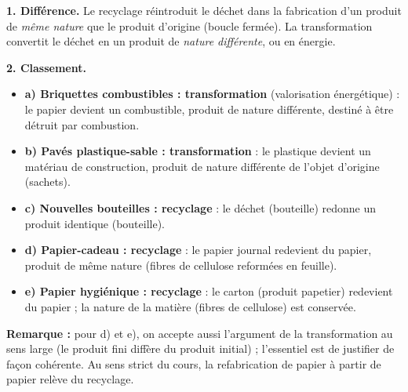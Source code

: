 \documentclass[11pt]{article}
\newcommand{\cle}[1]{{\popxbold\color{popdark}#1}}
\begin{document}
\begin{corrige}
\textbf{1. Différence.} Le \cle{recyclage} réintroduit le déchet dans la fabrication d'un produit de \emph{même nature} que le produit d'origine (boucle fermée). La \cle{transformation} convertit le déchet en un produit de \emph{nature différente}, ou en énergie.

\textbf{2. Classement.}
\begin{itemize}
\item \textbf{a) Briquettes combustibles : transformation} (valorisation énergétique) : le papier devient un combustible, produit de nature différente, destiné à être détruit par combustion.
\item \textbf{b) Pavés plastique-sable : transformation} : le plastique devient un matériau de construction, produit de nature différente de l'objet d'origine (sachets).
\item \textbf{c) Nouvelles bouteilles : recyclage} : le déchet (bouteille) redonne un produit identique (bouteille).
\item \textbf{d) Papier-cadeau : recyclage} : le papier journal redevient du papier, produit de même nature (fibres de cellulose reformées en feuille).
\item \textbf{e) Papier hygiénique : recyclage} : le carton (produit papetier) redevient du papier ; la nature de la matière (fibres de cellulose) est conservée.
\end{itemize}

\textbf{Remarque :} pour d) et e), on accepte aussi l'argument de la transformation au sens large (le produit fini diffère du produit initial) ; l'essentiel est de justifier de façon cohérente. Au sens strict du cours, la refabrication de papier à partir de papier relève du recyclage.
\end{corrige}
\end{document}
